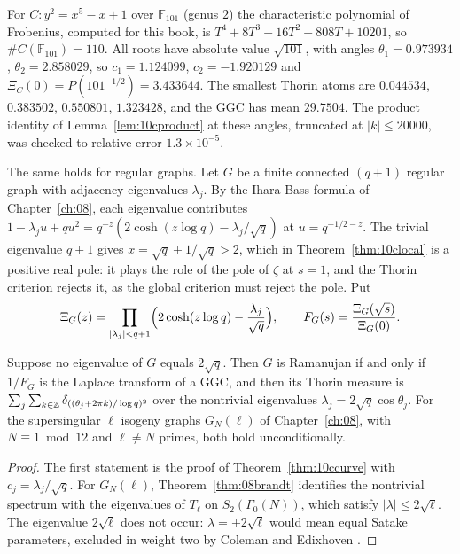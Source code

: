 \begin{example}
For $C:y^2=x^5-x+1$ over $\mathbb F_{101}$ (genus $2$) the characteristic polynomial of Frobenius, computed for this book, is $T^4+8T^3-16T^2+808T+10201$, so $\#C(\mathbb F_{101})=110$. All roots have absolute value $\sqrt{101}$, with angles $\theta_1=0.973934$, $\theta_2=2.858029$, so $c_1=1.124099$, $c_2=-1.920129$ and $\Xi_C(0)=P(101^{-1/2})=3.433644$. The smallest Thorin atoms are $0.044534$, $0.383502$, $0.550801$, $1.323428$, and the GGC has mean $29.7504$. The product identity of Lemma~\ref{lem:10cproduct} at these angles, truncated at $|k|\le20000$, was checked to relative error $1.3\times10^{-5}$.
\end{example}

The same holds for regular graphs. Let $G$ be a finite connected $(q+1)$ regular graph with adjacency eigenvalues $\lambda_j$. By the Ihara Bass formula of Chapter~\ref{ch:08}, each eigenvalue contributes $1-\lambda_ju+qu^2=q^{-z}(2\cosh(z\log q)-\lambda_j/\sqrt q)$ at $u=q^{-1/2-z}$. The trivial eigenvalue $q+1$ gives $x=\sqrt q+1/\sqrt q>2$, which in Theorem~\ref{thm:10clocal} is a positive real pole: it plays the role of the pole of $\zeta$ at $s=1$, and the Thorin criterion rejects it, as the global criterion must reject the pole. Put
\[
\Xi_G(z)=\prod_{|\lambda_j|<q+1}\Bigl(2\cosh(z\log q)-\frac{\lambda_j}{\sqrt q}\Bigr),\qquad F_G(s)=\frac{\Xi_G(\sqrt s)}{\Xi_G(0)} .
\]

\begin{theorem}\label{thm:10cihara}
Suppose no eigenvalue of $G$ equals $2\sqrt q$. Then $G$ is Ramanujan if and only if $1/F_G$ is the Laplace transform of a GGC, and then its Thorin measure is $\sum_j\sum_{k\in\mathbb{Z}}\delta_{((\theta_j+2\pi k)/\log q)^2}$ over the nontrivial eigenvalues $\lambda_j=2\sqrt q\cos\theta_j$. For the supersingular $\ell$ isogeny graphs $G_N(\ell)$ of Chapter~\ref{ch:08}, with $N\equiv1\bmod12$ and $\ell\ne N$ primes, both hold unconditionally.
\end{theorem}

\begin{proof}
The first statement is the proof of Theorem~\ref{thm:10ccurve} with $c_j=\lambda_j/\sqrt q$. For $G_N(\ell)$, Theorem~\ref{thm:08brandt} identifies the nontrivial spectrum with the eigenvalues of $T_\ell$ on $S_2(\Gamma_0(N))$, which satisfy $|\lambda|\le2\sqrt\ell$. The eigenvalue $2\sqrt\ell$ does not occur: $\lambda=\pm2\sqrt\ell$ would mean equal Satake parameters, excluded in weight two by Coleman and Edixhoven \cite{colemanedixhoven1998}.
\end{proof}

